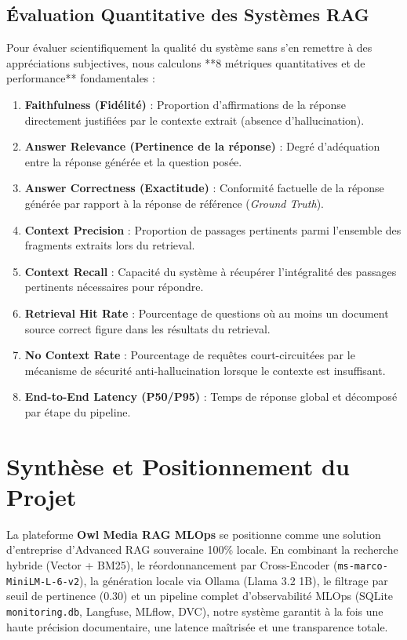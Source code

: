 \subsection{Évaluation Quantitative des Systèmes RAG}
Pour évaluer scientifiquement la qualité du système sans s'en remettre à des appréciations subjectives, nous calculons **8 métriques quantitatives et de performance** fondamentales :
\begin{enumerate}
    \item \textbf{Faithfulness (Fidélité)} : Proportion d'affirmations de la réponse directement justifiées par le contexte extrait (absence d'hallucination).
    \item \textbf{Answer Relevance (Pertinence de la réponse)} : Degré d'adéquation entre la réponse générée et la question posée.
    \item \textbf{Answer Correctness (Exactitude)} : Conformité factuelle de la réponse générée par rapport à la réponse de référence (\textit{Ground Truth}).
    \item \textbf{Context Precision} : Proportion de passages pertinents parmi l'ensemble des fragments extraits lors du retrieval.
    \item \textbf{Context Recall} : Capacité du système à récupérer l'intégralité des passages pertinents nécessaires pour répondre.
    \item \textbf{Retrieval Hit Rate} : Pourcentage de questions où au moins un document source correct figure dans les résultats du retrieval.
    \item \textbf{No Context Rate} : Pourcentage de requêtes court-circuitées par le mécanisme de sécurité anti-hallucination lorsque le contexte est insuffisant.
    \item \textbf{End-to-End Latency (P50/P95)} : Temps de réponse global et décomposé par étape du pipeline.
\end{enumerate}

\section{Synthèse et Positionnement du Projet}
La plateforme \textbf{Owl Media RAG MLOps} se positionne comme une solution d'entreprise d'Advanced RAG souveraine 100\% locale. En combinant la recherche hybride (Vector + BM25), le réordonnancement par Cross-Encoder (\texttt{ms-marco-MiniLM-L-6-v2}), la génération locale via Ollama (Llama 3.2 1B), le filtrage par seuil de pertinence ($0.30$) et un pipeline complet d'observabilité MLOps (SQLite \texttt{monitoring.db}, Langfuse, MLflow, DVC), notre système garantit à la fois une haute précision documentaire, une latence maîtrisée et une transparence totale.


